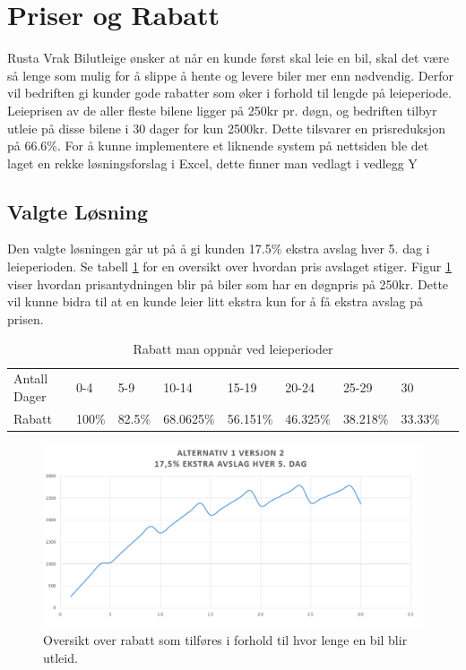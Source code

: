 \section{Priser og Rabatt}
Rusta Vrak Bilutleige ønsker at når en kunde først skal leie en bil, skal det være så lenge som mulig for å slippe å hente og levere biler mer enn nødvendig. Derfor vil bedriften gi kunder gode rabatter som øker i forhold til lengde på leieperiode. Leieprisen av de aller fleste bilene ligger på 250kr pr. døgn, og bedriften tilbyr utleie på disse bilene i 30 dager for kun 2500kr. Dette tilsvarer en prisreduksjon på 66.6\%. For å kunne implementere et liknende system på nettsiden ble det laget en rekke løsningsforslag i Excel, dette finner man vedlagt i vedlegg Y

\subsection*{Valgte Løsning}
Den valgte løsningen går ut på å gi kunden 17.5\% ekstra avslag hver 5. dag i leieperioden. Se tabell \ref{table:percent} for en oversikt over hvordan pris avslaget stiger. Figur \ref{fig:price_reduction} viser hvordan prisantydningen blir på biler som har en døgnpris på 250kr. Dette vil kunne bidra til at en kunde leier litt ekstra kun for å få ekstra avslag på prisen. 

\begin{table}[htbp]
\centering
\caption{Rabatt man oppnår ved leieperioder}
\label{table:percent}
\begin{tabular}{|l|l|l|l|l|l|l|l|l}
\cline{1-8}
Antall Dager & 0-4   & 5-9    & 10-14     & 15-19    & 20-24    & 25-29    & 30      &  \\ \cline{1-8}
Rabatt       & 100\% & 82.5\% & 68.0625\% & 56.151\% & 46.325\% & 38.218\% & 33.33\% &  \\ \cline{1-8}
\end{tabular}
\end{table}



 \begin{figure}[htbp]
	\centering
		\includegraphics[scale=0.5]{Bilder/avslag.png}
	\caption[Utleiepris Diagram]{Oversikt over rabatt som tilføres i forhold til hvor lenge en bil blir utleid. } %
	\label{fig:price_reduction}
\end{figure}




